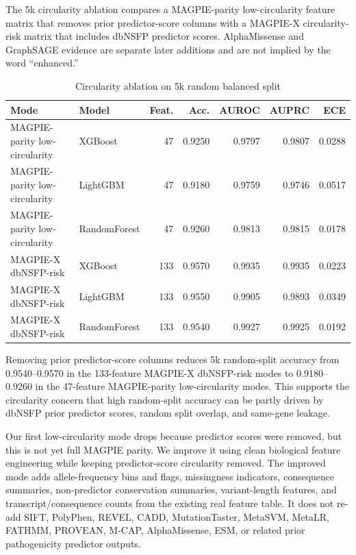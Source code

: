\documentclass[conference]{IEEEtran}
\begin{document}
The 5k circularity ablation compares a MAGPIE-parity low-circularity feature matrix that removes prior predictor-score columns with a MAGPIE-X circularity-risk matrix that includes dbNSFP predictor scores. AlphaMissense and GraphSAGE evidence are separate later additions and are not implied by the word ``enhanced.''

\begin{table}[t]
\centering
\scriptsize
\caption{Circularity ablation on 5k random balanced split}
\label{tab:circularity-ablation}
\begin{tabular}{llrrrrr}
\toprule
Mode & Model & Feat. & Acc. & AUROC & AUPRC & ECE \\
\midrule
MAGPIE-parity low-circularity & XGBoost & 47 & 0.9250 & 0.9797 & 0.9807 & 0.0288 \\
MAGPIE-parity low-circularity & LightGBM & 47 & 0.9180 & 0.9759 & 0.9746 & 0.0517 \\
MAGPIE-parity low-circularity & RandomForest & 47 & 0.9260 & 0.9813 & 0.9815 & 0.0178 \\
MAGPIE-X dbNSFP-risk & XGBoost & 133 & 0.9570 & 0.9935 & 0.9935 & 0.0223 \\
MAGPIE-X dbNSFP-risk & LightGBM & 133 & 0.9550 & 0.9905 & 0.9893 & 0.0349 \\
MAGPIE-X dbNSFP-risk & RandomForest & 133 & 0.9540 & 0.9927 & 0.9925 & 0.0192 \\
\bottomrule
\end{tabular}
\end{table}

Removing prior predictor-score columns reduces 5k random-split accuracy from 0.9540--0.9570 in the 133-feature MAGPIE-X dbNSFP-risk modes to 0.9180--0.9260 in the 47-feature MAGPIE-parity low-circularity modes. This supports the circularity concern that high random-split accuracy can be partly driven by dbNSFP prior predictor scores, random split overlap, and same-gene leakage.

Our first low-circularity mode drops because predictor scores were removed, but this is not yet full MAGPIE parity. We improve it using clean biological feature engineering while keeping predictor-score circularity removed. The improved mode adds allele-frequency bins and flags, missingness indicators, consequence summaries, non-predictor conservation summaries, variant-length features, and transcript/consequence counts from the existing real feature table. It does not re-add SIFT, PolyPhen, REVEL, CADD, MutationTaster, MetaSVM, MetaLR, FATHMM, PROVEAN, M-CAP, AlphaMissense, ESM, or related prior pathogenicity predictor outputs.
\end{document}
